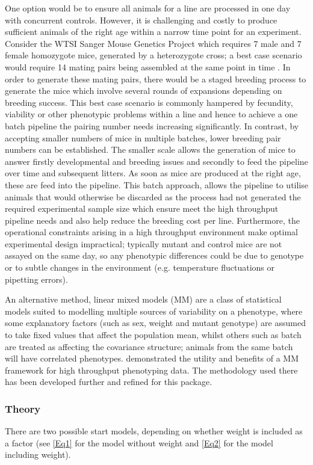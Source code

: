 \documentclass[12pt,a4paper]{article}
\begin{document}
One option would be to ensure all animals for a line are processed in one day with concurrent controls.  However, it is challenging and costly to produce sufficient animals of the right age within a narrow time point for an experiment.  Consider the WTSI Sanger Mouse Genetics Project which requires 7 male and 7 female homozygote mice, generated by a heterozygote cross; a best case scenario would require 14 mating pairs being assembled at the same point in time \cite{Pinkert}.  In order to generate these mating pairs, there would be a staged breeding process to generate the mice which involve several rounds of expansions depending on breeding success.  This best case scenario is commonly hampered by fecundity, viability or other phenotypic problems within a line and hence to achieve a one batch pipeline the pairing number needs increasing significantly.  In contrast, by accepting smaller numbers of mice in multiple batches, lower breeding pair numbers can be established.  The smaller scale allows the 
generation of mice to answer firstly developmental and breeding issues and secondly to feed the pipeline over time and subsequent litters.  As soon as mice are produced at the right age, these are feed into the pipeline.  This batch approach, allows the pipeline to utilise animals that would otherwise be discarded as the process had not generated the required experimental sample size which ensure meet the high throughput pipeline needs and also help reduce the breeding cost per line.  Furthermore, the operational constraints arising in a high throughput environment make optimal experimental design impractical; typically mutant and control mice are not assayed on the same day, so any phenotypic differences could be due to genotype or to subtle changes in the environment (e.g. temperature fluctuations or pipetting errors).  
 
An alternative method, linear mixed models (MM) are a class of statistical models suited to modelling multiple sources of variability on a phenotype, where some explanatory factors (such as sex, weight and mutant genotype) are assumed to take fixed values that affect the population mean, whilst others such as batch are treated as affecting the covariance structure; animals from the same batch will have correlated phenotypes. \cite{MM12} demonstrated the utility and benefits of a MM framework for high throughput phenotyping data. The methodology used there has been developed further and refined for this package. 

\subsubsection{Theory}
There are two possible start models, depending on whether weight is included as a factor (see \ref{Eq1} for the model without weight and \ref{Eq2} for the model including weight).
\end{document}
